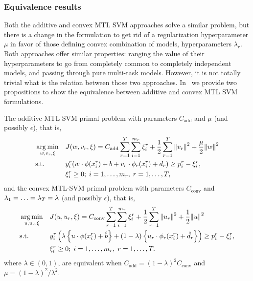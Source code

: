 \subsubsection{Equivalence results}
Both the {additive} and {convex} MTL SVM approaches solve a similar problem, but there is a change in the formulation to get rid of a regularization hyperparameter $\mu$ in favor of those defining convex combination of models, hyperparameters $\lambda_r$.
Both approaches offer similar properties: ranging the value of their hyperparameters to go from completely common to completely independent models, and passing through pure multi-task models.
However, it is not totally trivial what is the relation between those two approaches.
In~\cite{RuizAD19} we provide two propositions to show the equivalence between {additive} and {convex} MTL SVM formulations.
\begin{prop}\label{prop:add_conv_equiv}
    The {additive} MTL-SVM primal problem with parameters $C_\text{add}$ and $\mu$ (and possibly $\epsilon$), that is,
    \begin{equation}\label{eq:svmmtl_primal_add_equiv}
        \begin{aligned}
        & \argmin_{w, {v}_r, \xi}
        & & {J({w}, {v}_r, \xi) = C_\text{add} \sum_{r= 1}^T \sum_{i=1}^{m_r} {\xi_{i}^r} + \frac{1}{2} \sum_{r= 1}^T{\norm{{v}_r}^2} + \frac{\mu}{2} {\norm{{w}}}^2} \\
        & \text{s.t.}
        & & y_{i}^r ({w} \cdot \phi(x_{i}^r) + b  + {v}_r \cdot \phi_r(x_{i}^r) + d_r) \geq p_{i}^r - \xi_{i}^r ,  \\
        & & & \xi_{i}^r \geq 0; \;  i=1 , \dotsc , m_r, \;  r= 1,\dotsc, T  , \\
        \end{aligned}
    \end{equation}
    and the {convex} MTL-SVM primal problem with parameters $C_\text{conv}$ and $\lambda_1=\ldots=\lambda_T = \lambda$ (and possibly $\epsilon$), that is,
    \begin{equation}\label{eq:svmmtl_primal_convex_equiv}
        \begin{aligned}
        & \argmin_{u, {u}_r, \xi}
        & & {J({u}, {u}_r, \xi) = C_\text{conv} \sum_{r= 1}^T \sum_{i=1}^{m_r} {\xi_{i}^r} + \frac{1}{2} \sum_{r= 1}^T{\norm{{u}_r}^2} + \frac{1}{2} {\norm{{u}}}^2} \\
        & \text{s.t.}
        & & y_{i}^r \left(\lambda \left\lbrace {u} \cdot \phi(x_{i}^r) + \hat{b} \right\rbrace + (1 - \lambda) \left\lbrace {u}_r \cdot \phi_r(x_{i}^r) + \hat{d}_r \right\rbrace  \right) \geq p_{i}^r - \xi_{i}^r ,  \\
        & & & \xi_{i}^r \geq 0; \;  i=1 , \dotsc , m_r, \;  r= 1,\dotsc, T  . \\
        \end{aligned}
    \end{equation}
    where $\lambda \in (0, 1)$, are equivalent when $C_\text{add} = (1 - \lambda)^2 C_\text{conv}$ and $\mu = (1 - \lambda)^2 / \lambda^2$.
    \label{thm_equiv}
\end{prop}
